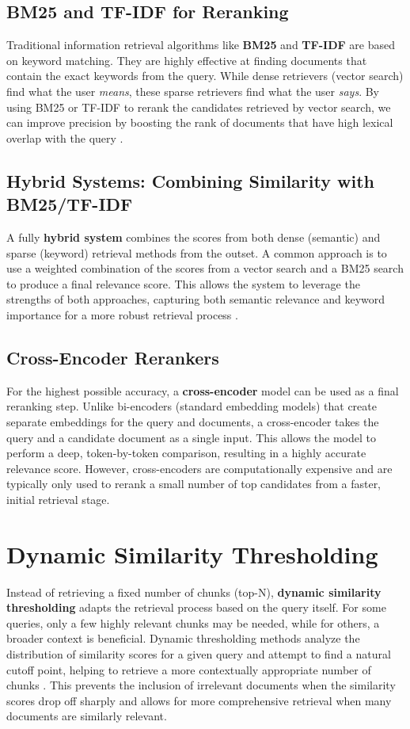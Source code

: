 \subsection{BM25 and TF-IDF for Reranking}
Traditional information retrieval algorithms like \textbf{BM25} and \textbf{TF-IDF} are based on keyword matching. They are highly effective at finding documents that contain the exact keywords from the query. While dense retrievers (vector search) find what the user \textit{means}, these sparse retrievers find what the user \textit{says}. By using BM25 or TF-IDF to rerank the candidates retrieved by vector search, we can improve precision by boosting the rank of documents that have high lexical overlap with the query \autocite{llm_ir_survey_2024}.

\subsection{Hybrid Systems: Combining Similarity with BM25/TF-IDF}
A fully \textbf{hybrid system} combines the scores from both dense (semantic) and sparse (keyword) retrieval methods from the outset. A common approach is to use a weighted combination of the scores from a vector search and a BM25 search to produce a final relevance score. This allows the system to leverage the strengths of both approaches, capturing both semantic relevance and keyword importance for a more robust retrieval process \autocite{reranking_survey_2025_djoudi}.

\subsection{Cross-Encoder Rerankers}
For the highest possible accuracy, a \textbf{cross-encoder} model can be used as a final reranking step. Unlike bi-encoders (standard embedding models) that create separate embeddings for the query and documents, a cross-encoder takes the query and a candidate document as a single input. This allows the model to perform a deep, token-by-token comparison, resulting in a highly accurate relevance score. However, cross-encoders are computationally expensive and are typically only used to rerank a small number of top candidates from a faster, initial retrieval stage.

\section{Dynamic Similarity Thresholding}
Instead of retrieving a fixed number of chunks (top-N), \textbf{dynamic similarity thresholding} adapts the retrieval process based on the query itself. For some queries, only a few highly relevant chunks may be needed, while for others, a broader context is beneficial. Dynamic thresholding methods analyze the distribution of similarity scores for a given query and attempt to find a natural cutoff point, helping to retrieve a more contextually appropriate number of chunks \autocite{dynamic_thresholding_dell_2023}. This prevents the inclusion of irrelevant documents when the similarity scores drop off sharply and allows for more comprehensive retrieval when many documents are similarly relevant.